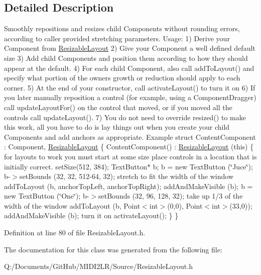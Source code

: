 \subsection{Detailed Description}
Smoothly repositions and resizes child Components without rounding errors, according to caller provided stretching parameters. Usage\+: 1) Derive your Component from \hyperlink{class_resizable_layout}{Resizable\+Layout} 2) Give your Component a well defined default size 3) Add child Components and position them according to how they should appear at the default. 4) For each child Component, also call add\+To\+Layout() and specify what portion of the owner\textquotesingle{}s growth or reduction should apply to each corner. 5) At the end of your constructor, call activate\+Layout() to turn it on 6) If you later manually reposition a control (for example, using a Component\+Dragger) call update\+Layout\+For() on the control that moved, or if you moved all the controls call update\+Layout(). 7) You do not need to override resized() to make this work, all you have to do is lay things out when you create your child Components and add anchors as appropriate. Example struct Content\+Component \+: Component, \hyperlink{class_resizable_layout}{Resizable\+Layout} \{ Content\+Component() \+: \hyperlink{class_resizable_layout}{Resizable\+Layout} (this) \{ for layouts to work you must start at some size place controls in a location that is initially correct. set\+Size(512, 384); Text\+Button$\ast$ b; b = new Text\+Button (\char`\"{}\+Juce\char`\"{}); b-\/$>$set\+Bounds (32, 32, 512-\/64, 32); stretch to fit the width of the window add\+To\+Layout (b, anchor\+Top\+Left, anchor\+Top\+Right); add\+And\+Make\+Visible (b); b = new Text\+Button (\char`\"{}\+One\char`\"{}); b-\/$>$set\+Bounds (32, 96, 128, 32); take up 1/3 of the width of the window add\+To\+Layout (b, Point$<$int$>$(0,0), Point$<$int$>$(33,0)); add\+And\+Make\+Visible (b); turn it on activate\+Layout(); \} \} 

Definition at line 80 of file Resizable\+Layout.\+h.



The documentation for this class was generated from the following file\+:\begin{DoxyCompactItemize}
\item 
Q\+:/\+Documents/\+Git\+Hub/\+M\+I\+D\+I2\+L\+R/\+Source/Resizable\+Layout.\+h\end{DoxyCompactItemize}
